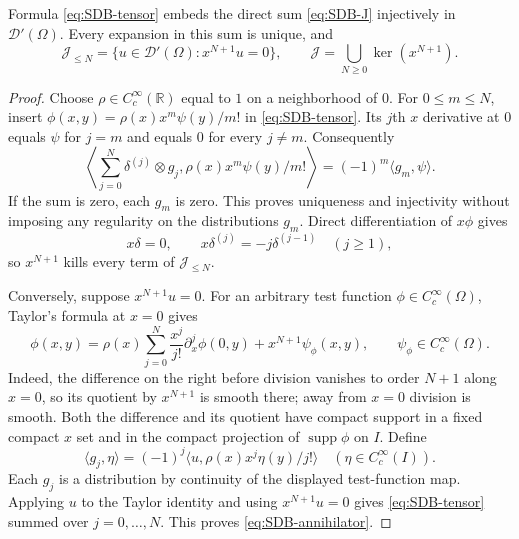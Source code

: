 \begin{proposition}
\label{prop:SDB-embedding}
Formula \eqref{eq:SDB-tensor} embeds the direct sum
\eqref{eq:SDB-J} injectively in $\mathcal D'(\Omega)$.
Every expansion in this sum is unique, and
\begin{equation}\tag{SDB5}\label{eq:SDB-annihilator}
 \mathcal J_{\leq N}
 =\{u\in\mathcal D'(\Omega):x^{N+1}u=0\},\qquad
 \mathcal J=\bigcup_{N\geq0}\ker(x^{N+1}).
\end{equation}
\end{proposition}
\begin{proof}
Choose $\rho\in C_c^\infty(\mathbb R)$ equal to $1$ on a
neighborhood of $0$. For $0\leq m\leq N$, insert
$\phi(x,y)=\rho(x)x^m\psi(y)/m!$ in \eqref{eq:SDB-tensor}.
Its $j$th $x$ derivative at $0$ equals $\psi$ for $j=m$ and equals
$0$ for every $j\ne m$. Consequently
\[
 \left\langle\sum_{j=0}^N\delta^{(j)}\otimes g_j,
       \rho(x)x^m\psi(y)/m!\right\rangle
 =(-1)^m\langle g_m,\psi\rangle.
\]
If the sum is zero, each $g_m$ is zero. This proves uniqueness and
injectivity without imposing any regularity on the distributions $g_m$.
Direct differentiation of $x\phi$ gives
\begin{equation}\tag{SDB6}\label{eq:SDB-xdelta}
 x\delta=0,\qquad
 x\delta^{(j)}=-j\delta^{(j-1)}\quad(j\geq1),
\end{equation}
so $x^{N+1}$ kills every term of $\mathcal J_{\leq N}$.

Conversely, suppose $x^{N+1}u=0$. For an arbitrary test function
$\phi\in C_c^\infty(\Omega)$, Taylor's formula at $x=0$ gives
\[
 \phi(x,y)=
 \rho(x)\sum_{j=0}^N\frac{x^j}{j!}\partial_x^j\phi(0,y)
       +x^{N+1}\psi_\phi(x,y),
 \qquad \psi_\phi\in C_c^\infty(\Omega).
\]
Indeed, the difference on the right before division vanishes to order
$N+1$ along $x=0$, so its quotient by $x^{N+1}$ is smooth there;
away from $x=0$ division is smooth. Both the difference and its quotient
have compact support in a fixed compact $x$ set and in the compact
projection of $\operatorname{supp}\phi$ on $I$.
Define
\[
 \langle g_j,\eta\rangle
   =(-1)^j\langle u,\rho(x)x^j\eta(y)/j!\rangle
       \quad(\eta\in C_c^\infty(I)).
\]
Each $g_j$ is a distribution by continuity of the displayed test-function
map. Applying $u$ to the Taylor identity and using $x^{N+1}u=0$
gives \eqref{eq:SDB-tensor} summed over $j=0,\ldots,N$.
This proves \eqref{eq:SDB-annihilator}.
\end{proof}

